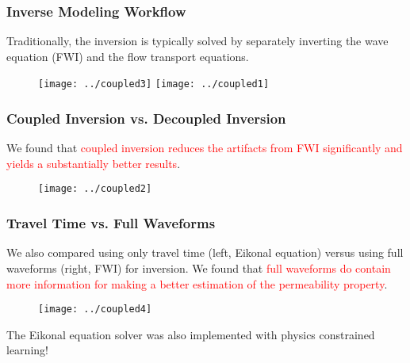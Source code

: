 \documentclass[usenames,dvipsnames]{beamer}
\begin{document}
\begin{frame}
	\frametitle{Inverse Modeling Workflow}
	Traditionally, the inversion is typically solved by separately inverting the wave equation (FWI) and the flow transport equations. 
	\begin{figure}
		\centering
			\texttt{[image: ../coupled3]}
		\texttt{[image: ../coupled1]}
	\end{figure}
\end{frame}


\begin{frame}
	\frametitle{Coupled Inversion vs. Decoupled Inversion}
	We found that \textcolor{red}{coupled inversion reduces the artifacts from FWI significantly and yields a substantially better results}. 
	\begin{figure}
		\centering
		\texttt{[image: ../coupled2]}
	\end{figure}
\end{frame}

\begin{frame}
	\frametitle{Travel Time vs. Full Waveforms}
	We also compared using only travel time (left, Eikonal equation) versus using full waveforms (right, FWI) for inversion. We found that \textcolor{red}{full waveforms do contain more information for making a better estimation of the permeability property}. 
		\begin{figure}
		\centering
		\texttt{[image: ../coupled4]}
	\end{figure}

{\small The Eikonal equation solver was also implemented with physics constrained learning!}
\end{frame}
\end{document}
